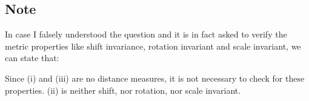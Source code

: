 
\subsection*{Note} %
\label{sub:note}

In case I falsely understood the question and it is in fact asked to verify the metric properties like shift invariance, rotation 
invariant and scale invariant, we can state that: 

Since (i) and (iii) are no distance measures, it is not necessary to check for these properties. 
(ii) is neither shift, nor rotation, nor scale invariant.


